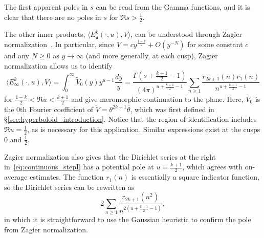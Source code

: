 The first apparent poles in $s$ can be read from the Gamma functions, and it is clear that
there are no poles in $s$ for $\Re s > \frac{1}{2}$.


The other inner products, $\langle E_\mathfrak{a}^k(\cdot, u), V \rangle$, can be
understood through Zagier normalization~\cite{ZagierRankinSelberg}.
In particular, since $V = c y^{\frac{1-k}{2}} + O(y^{-N})$ for some constant $c$ and any
$N \geq 0$ as $y \to \infty$ (and more generally, at each cusp), Zagier normalization
allows us to identify
\begin{equation}\label{eq:continuous_stepI}
  \langle E_\infty^k(\cdot, u), V \rangle = \int_0^\infty \widetilde{V}_0(y) y^{u-1}
  \frac{dy}{y} = \frac{\Gamma(s + \frac{k+1}{2} - 1)}{(4\pi)^{u + \frac{k+1}{2} - 1}}
  \sum_{n \geq 1} \frac{r_{2k+1}(n)r_1(n)}{n^{u + \frac{k+1}{2} - 1}}
\end{equation}
for $\frac{1-k}{2} < \Re u < \frac{k+1}{2}$ and give meromorphic continuation to the plane.
Here, $\widetilde{V}_0$ is the $0$th Fourier coefficient of $\widetilde{V} = \theta^{2k+1}
\overline{\theta}$, which was first defined in \S\ref{sec:hyperboloid_introduction}.
Notice that the region of identification includes $\Re u = \frac{1}{2}$, as is necessary
for this application.
Similar expressions exist at the cusps $0$ and $\frac{1}{2}$.


\begin{remark}
  Zagier normalization also gives that the Dirichlet series at the right
  in~\eqref{eq:continuous_stepI} has a potential pole at $u = \frac{k+1}{2}$, which agrees
  with on-average estimates.
  The function $r_1(n)$ is essentially a square indicator function, so the Dirichlet
  series can be rewritten as
  \begin{equation}
    2\sum_{n \geq 1} \frac{r_{2k+1}(n^2)}{n^{2(u + \frac{k+1}{2} - 1)}},
  \end{equation}
  in which it is straightforward to use the Gaussian heuristic to confirm the pole from
  Zagier normalization.
\end{remark}


